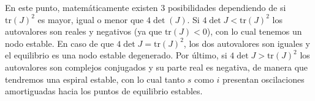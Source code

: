 En este punto, matemáticamente existen 3 posibilidades dependiendo de si $\text{tr}(J)^2$ es mayor, igual o menor que $4\det (J)$. Si $4\det J < \text{tr} (J)^2$ los autovalores son reales y negativos (ya que $\text{tr}(J)<0$), con lo cual tenemos un nodo estable. En caso de que $4\det J = \text{tr} (J)^2$, los dos autovalores son iguales y el equilibrio es una nodo estable degenerado. Por último, si $4\det J > \text{tr} (J)^2$ los autovalores son complejos conjugados y su parte real es negativa, de manera que tendremos una espiral estable, con lo cual tanto $s$ como $i$ presentan oscilaciones amortiguadas hacia los puntos de equilibrio estables.
